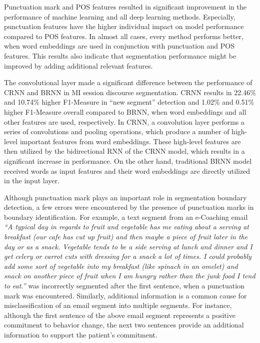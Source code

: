 \documentclass{amia}
\begin{document}
Punctuation mark and POS features resulted in significant improvement in the performance of machine learning and all deep learning methods. Especially, punctuation features have the higher individual impact on model performance compared to POS features. In almost all cases, every method performs better, when word embeddings are used in conjunction with punctuation and POS features. This results also indicate that segmentation performance might be improved by adding additional relevant features.

The convolutional layer made a significant difference between the performance of CRNN and BRNN in MI session discourse segmentation. CRNN results in 22.46\% and 10.74\% higher F1-Measure in ``new segment'' detection and 1.02\% and 0.51\% higher F1-Measure overall compared to BRNN, when word embeddings and all other features are used, respectively. In CRNN, a convolution layer performs a series of convolutions and pooling operations, which produce a number of high-level important features from word embeddings. These high-level features are then utilized by the bidirectional RNN of the CRNN model, which results in a significant increase in performance. On the other hand, traditional BRNN model received words as input features and their word embeddings are directly utilized in the input layer.     

Although punctuation mark plays an important role in segmentation boundary detection, a few errors were encountered by the presence of punctuation marks in boundary identification. For example, a text segment from an e-Coaching email \textit{``A typical day in regards to fruit and vegetable has me eating about a serving at breakfast (our cafe has cut up fruit) and then maybe a piece of fruit later in the day or as a snack. Vegetable tends to be a side serving at lunch and dinner and I get celery or carrot cuts with dressing for a snack a lot of times. I could probably add some sort of vegetable into my breakfast (like spinach in an omelet) and snack on another piece of fruit when I am hungry rather than the junk food I tend to eat.''} was incorrectly segmented after the first sentence, when a punctuation mark was encountered. Similarly, additional information is a common cause for misclassification of an email segment into multiple segments. For instance, although the first sentence of the above email segment represents a positive commitment to behavior change, the next two sentences provide an additional information to support the patient's commitment. 
\end{document}
